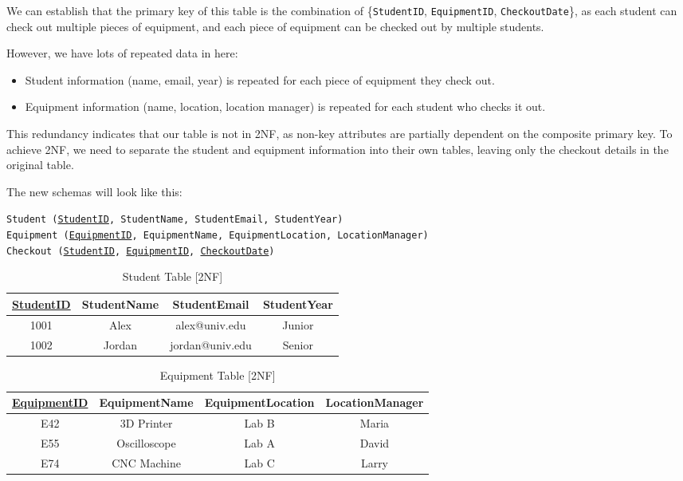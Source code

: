 We can establish that the primary key of this table is the combination of \{\texttt{StudentID}, \texttt{EquipmentID}, \texttt{CheckoutDate}\}, as each student can check out multiple pieces of equipment, and each piece of equipment can be checked out by multiple students.

However, we have lots of repeated data in here:
\begin{itemize}
    \item Student information (name, email, year) is repeated for each piece of equipment they check out.
    \item Equipment information (name, location, location manager) is repeated for each student who checks it out.
\end{itemize}

This redundancy indicates that our table is not in 2NF, as non-key attributes are partially dependent on the composite primary key. To achieve 2NF, we need to separate the student and equipment information into their own tables, leaving only the checkout details in the original table.

The new schemas will look like this:
\begin{center}
\texttt{Student (\underline{StudentID}, StudentName, StudentEmail, StudentYear)}\\
\texttt{Equipment (\underline{EquipmentID}, EquipmentName, EquipmentLocation, LocationManager)}\\
\texttt{Checkout (\underline{StudentID}, \underline{EquipmentID}, \underline{CheckoutDate})}
\end{center}

\begin{table}[H]
\centering
\begin{tabular}{|c|c|c|c|}
\hline
{\underline{StudentID}} & {StudentName} & {StudentEmail} & {StudentYear} \\
\hline
1001 & Alex & alex@univ.edu & Junior \\
\hline
1002 & Jordan & jordan@univ.edu & Senior \\
\hline
\end{tabular}
\caption{Student Table [2NF]}
\label{tab:student_2nf}
\end{table}

\begin{table}[H]
\centering
\begin{tabular}{|c|c|c|c|}
\hline
{\underline{EquipmentID}} & {EquipmentName} & {EquipmentLocation} & {LocationManager} \\
\hline
E42 & 3D Printer & Lab B & Maria \\
\hline
E55 & Oscilloscope & Lab A & David \\
\hline
E74 & CNC Machine & Lab C & Larry \\
\hline
\end{tabular}
\caption{Equipment Table [2NF]}
\label{tab:equipment_2nf}
\end{table}

